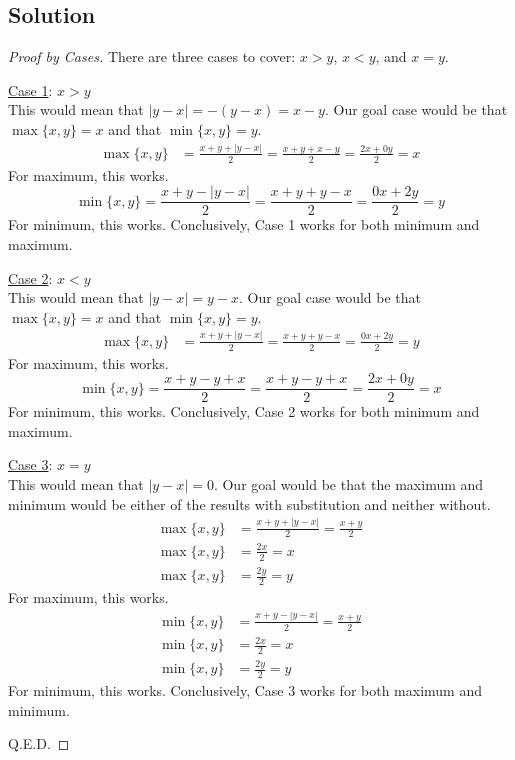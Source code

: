 \documentclass[12pt]{report}
\begin{document}
\subsection*{Solution}
\begin{proof}[Proof by Cases]
    There are three cases to cover: $x > y$, $x < y$, and $x = y$. 

    \underline{Case 1}: $x > y$\\
    This would mean that $|y - x| = -(y - x) = x - y$.
    Our goal case would be that $\max\{x,y\} = x$ and that $\min\{x,y\} = y$.
    \begin{align}
        \max\{x,y\} &=  \frac{x + y + |y - x|}{2}
            =   \frac{x + y + x - y}{2}
            =   \frac{2x + 0y}{2}
            =   x
    \end{align}
    For maximum, this works.
    \begin{equation}
        \min\{x,y\} =   \frac{x + y - |y - x|}{2}
            =   \frac{x + y + y - x}{2}
            =   \frac{0x + 2y}{2}
            =   y
    \end{equation}
    For minimum, this works. 
    Conclusively, Case 1 works for both minimum and maximum.

    \underline{Case 2}: $x < y$\\
    This would mean that $|y - x| = y - x$.
    Our goal case would be that $\max\{x,y\} = x$ and that $\min\{x,y\} = y$.
    \begin{align}
        \max\{x,y\} &=  \frac{x + y + |y - x|}{2}
            =   \frac{x + y + y - x}{2}
            =   \frac{0x + 2y}{2}
            =   y
    \end{align}
    For maximum, this works.
    \begin{equation}
        \min\{x,y\} =   \frac{x + y - y + x}{2}
            =   \frac{x + y - y + x}{2}
            =   \frac{2x + 0y}{2}
            =   x
    \end{equation}
    For minimum, this works. 
    Conclusively, Case 2 works for both minimum and maximum.

    \underline{Case 3}: $x = y$\\
    This would mean that $|y - x| = 0$.
    Our goal would be that the maximum and minimum would be either of the results with substitution and neither without.
    \begin{align}
        \max\{x,y\} &=  \frac{x + y + |y - x|}{2}
            =   \frac{x + y}{2}\\
        \max\{x,y\} &=  \frac{2x}{2}
            =   x\\
        \max\{x,y\} &=  \frac{2y}{2}
            =   y
    \end{align}
    For maximum, this works.
    \begin{align}
        \min\{x,y\} &=  \frac{x + y - |y - x|}{2}
            =   \frac{x + y}{2}\\
        \min\{x,y\} &=  \frac{2x}{2}
            =   x\\
        \min\{x,y\} &=  \frac{2y}{2}
            =   y
    \end{align}
    For minimum, this works.
    Conclusively, Case 3 works for both maximum and minimum.

    Q.E.D.
\end{proof}
\end{document}
